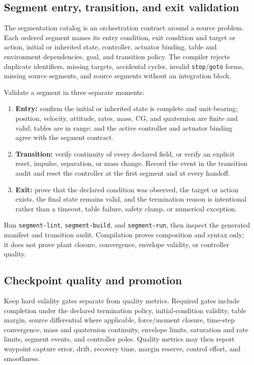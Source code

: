 \documentclass[11pt]{article}
\begin{document}
\subsection{Segment entry, transition, and exit validation}

The segmentation catalog is an orchestration contract around a source problem.
Each ordered segment names its entry condition, exit condition and target or
action, initial or inherited state, controller, actuator binding, table and
environment dependencies, goal, and transition policy. The compiler rejects
duplicate identifiers, missing targets, accidental cycles, invalid
\texttt{stop}/\texttt{goto} forms, missing source segments, and source
segments without an integration block.

Validate a segment in three separate moments:

\begin{enumerate}
  \item \textbf{Entry:} confirm the initial or inherited state is complete and
    unit-bearing; position, velocity, attitude, rates, mass, CG, and
    quaternion are finite and valid; tables are in range; and the active
    controller and actuator binding agree with the segment contract.
  \item \textbf{Transition:} verify continuity of every declared field, or
    verify an explicit reset, impulse, separation, or mass change. Record the
    event in the transition audit and reset the controller at the first
    segment and at every handoff.
  \item \textbf{Exit:} prove that the declared condition was observed, the
    target or action exists, the final state remains valid, and the termination
    reason is intentional rather than a timeout, table failure, safety clamp,
    or numerical exception.
\end{enumerate}

Run \texttt{segment-lint}, \texttt{segment-build}, and \texttt{segment-run},
then inspect the generated manifest and transition audit. Compilation proves
composition and syntax only; it does not prove plant closure, convergence,
envelope validity, or controller quality.

\subsection{Checkpoint quality and promotion}

Keep hard validity gates separate from quality metrics. Required gates include
completion under the declared termination policy, initial-condition validity,
table margin, source differential where applicable, force/moment closure,
time-step convergence, mass and quaternion continuity, envelope limits,
saturation and rate limits, segment events, and controller poles. Quality
metrics may then report waypoint capture error, drift, recovery time, margin
reserve, control effort, and smoothness.
\end{document}
